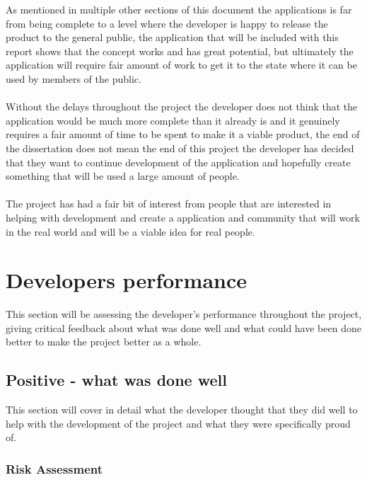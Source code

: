 As mentioned in multiple other sections of this document the applications is far from being complete to a level where the developer is happy to release the product to the general public, the application that will be included with this report shows that the concept works and has great potential, but ultimately the application will require fair amount of work to get it to the state where it can be used by members of the public.\\
\\
Without the delays throughout the project the developer does not think that the application would be much more complete than it already is and it genuinely requires a fair amount of time to be spent to make it a viable product, the end of the dissertation does not mean the end of this project the developer has decided that they want to continue development of the application and hopefully create something that will be used a large amount of people.\\
\\
The project has had a fair bit of interest from people that are interested in helping with development and create a application and community that will work in the real world and will be a viable idea for real people.


\section{Developers performance}

This section will be assessing the developer's performance throughout the project, giving critical feedback about what was done well and what could have been done better to make the project better as a whole.

\subsection{Positive - what was done well}

This section will cover in detail what the developer thought that they did well to help with the development of the project and what they were specifically proud of.

\subsubsection{Risk Assessment}

